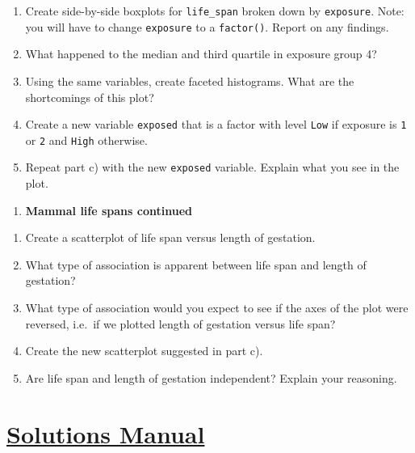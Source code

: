 \documentclass[
  letterpaper,
  DIV=11,
  numbers=noendperiod]{scrreprt}
\providecommand{\tightlist}{%
  \setlength{\itemsep}{0pt}\setlength{\parskip}{0pt}}\usepackage{longtable,booktabs,array}
\begin{document}
\begin{enumerate}
\def\labelenumi{\alph{enumi}.}
\item
  Create side-by-side boxplots for \texttt{life\_span} broken down by
  \texttt{exposure}. Note: you will have to change \texttt{exposure} to
  a \texttt{factor()}. Report on any findings.
\item
  What happened to the median and third quartile in exposure group 4?
\item
  Using the same variables, create faceted histograms. What are the
  shortcomings of this plot?
\item
  Create a new variable \texttt{exposed} that is a factor with level
  \texttt{Low} if exposure is \texttt{1} or \texttt{2} and \texttt{High}
  otherwise.
\item
  Repeat part c) with the new \texttt{exposed} variable. Explain what
  you see in the plot.
\end{enumerate}

\begin{enumerate}
\def\labelenumi{\arabic{enumi}.}
\setcounter{enumi}{2}
\tightlist
\item
  \textbf{Mammal life spans continued}
\end{enumerate}

\begin{enumerate}
\def\labelenumi{\alph{enumi}.}
\item
  Create a scatterplot of life span versus length of gestation.
\item
  What type of association is apparent between life span and length of
  gestation?
\item
  What type of association would you expect to see if the axes of the
  plot were reversed, i.e.~if we plotted length of gestation versus life
  span?
\item
  Create the new scatterplot suggested in part c).
\item
  Are life span and length of gestation independent? Explain your
  reasoning.
\end{enumerate}

\section*{\texorpdfstring{\href{https://ds-usafa.github.io/CPS-Solutions-Manual/NUMDATA.html}{Solutions
Manual}}{Solutions Manual}}\label{solutions-manual-5}
\end{document}
